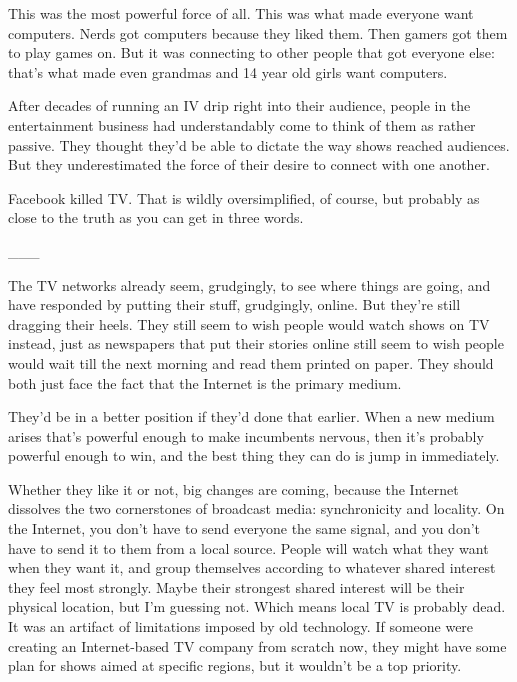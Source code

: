 This
                  was the most powerful force of all. This was what made
                  everyone want computers. Nerds got computers because they
                  liked them. Then gamers got them to play games on. But it was
                  connecting to other people that got everyone else: that's what
                  made even grandmas and 14 year old girls want computers.
                  

After decades of running an IV drip right
                  into their audience, people in the entertainment business had
                  understandably come to think of them as rather passive. They
                  thought they'd be able to dictate the way shows reached
                  audiences. But they underestimated the force of their desire
                  to connect with one another.

Facebook killed TV.
                  That is wildly oversimplified, of course, but probably as
                  close to the truth as you can get in three words.


                  \_\_\_
                  

The TV networks already seem, grudgingly, to see
                  where things are going, and have responded by putting their
                  stuff, grudgingly, online. But they're still dragging their
                  heels. They still seem to wish people would watch shows on TV
                  instead, just as newspapers that put their stories online
                  still seem to wish people would wait till the next morning and
                  read them printed on paper. They should both just face the
                  fact that the Internet is the primary medium.

They'd
                  be in a better position if they'd done that earlier. When a
                  new medium arises that's powerful enough to make incumbents
                  nervous, then it's probably powerful enough to win, and the
                  best thing they can do is jump in immediately.

Whether
                  they like it or not, big changes are coming, because the
                  Internet dissolves the two cornerstones of broadcast media:
                  synchronicity and locality. On the Internet, you don't have to
                  send everyone the same signal, and you don't have to send it
                  to them from a local source. People will watch what they want
                  when they want it, and group themselves according to whatever
                  shared interest they feel most strongly. Maybe their strongest
                  shared interest will be their physical location, but I'm
                  guessing not. Which means local TV is probably dead. It was an
                  artifact of limitations imposed by old technology. If someone
                  were creating an Internet-based TV company from scratch now,
                  they might have some plan for shows aimed at specific regions,
                  but it wouldn't be a top priority.

